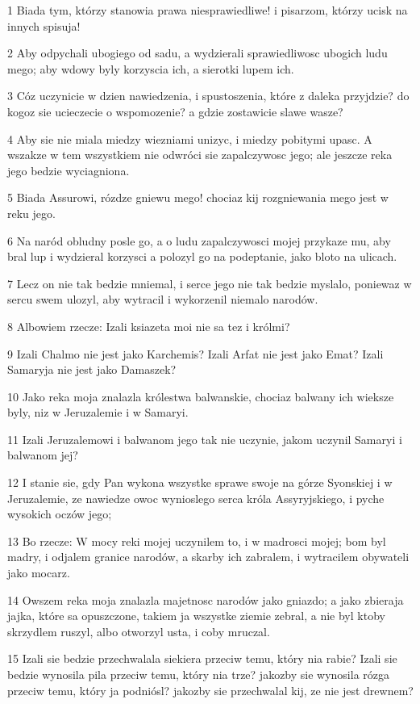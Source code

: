 \par 1 Biada tym, którzy stanowia prawa niesprawiedliwe! i pisarzom, którzy ucisk na innych spisuja!
\par 2 Aby odpychali ubogiego od sadu, a wydzierali sprawiedliwosc ubogich ludu mego; aby wdowy byly korzyscia ich, a sierotki lupem ich.
\par 3 Cóz uczynicie w dzien nawiedzenia, i spustoszenia, które z daleka przyjdzie? do kogoz sie ucieczecie o wspomozenie? a gdzie zostawicie slawe wasze?
\par 4 Aby sie nie miala miedzy wiezniami unizyc, i miedzy pobitymi upasc. A wszakze w tem wszystkiem nie odwróci sie zapalczywosc jego; ale jeszcze reka jego bedzie wyciagniona.
\par 5 Biada Assurowi, rózdze gniewu mego! chociaz kij rozgniewania mego jest w reku jego.
\par 6 Na naród obludny posle go, a o ludu zapalczywosci mojej przykaze mu, aby bral lup i wydzieral korzysci a polozyl go na podeptanie, jako bloto na ulicach.
\par 7 Lecz on nie tak bedzie mniemal, i serce jego nie tak bedzie myslalo, poniewaz w sercu swem ulozyl, aby wytracil i wykorzenil niemalo narodów.
\par 8 Albowiem rzecze: Izali ksiazeta moi nie sa tez i królmi?
\par 9 Izali Chalmo nie jest jako Karchemis? Izali Arfat nie jest jako Emat? Izali Samaryja nie jest jako Damaszek?
\par 10 Jako reka moja znalazla królestwa balwanskie, chociaz balwany ich wieksze byly, niz w Jeruzalemie i w Samaryi.
\par 11 Izali Jeruzalemowi i balwanom jego tak nie uczynie, jakom uczynil Samaryi i balwanom jej?
\par 12 I stanie sie, gdy Pan wykona wszystke sprawe swoje na górze Syonskiej i w Jeruzalemie, ze nawiedze owoc wynioslego serca króla Assyryjskiego, i pyche wysokich oczów jego;
\par 13 Bo rzecze: W mocy reki mojej uczynilem to, i w madrosci mojej; bom byl madry, i odjalem granice narodów, a skarby ich zabralem, i wytracilem obywateli jako mocarz.
\par 14 Owszem reka moja znalazla majetnosc narodów jako gniazdo; a jako zbieraja jajka, które sa opuszczone, takiem ja wszystke ziemie zebral, a nie byl ktoby skrzydlem ruszyl, albo otworzyl usta, i coby mruczal.
\par 15 Izali sie bedzie przechwalala siekiera przeciw temu, który nia rabie? Izali sie bedzie wynosila pila przeciw temu, który nia trze? jakozby sie wynosila rózga przeciw temu, który ja podniósl? jakozby sie przechwalal kij, ze nie jest drewnem?
